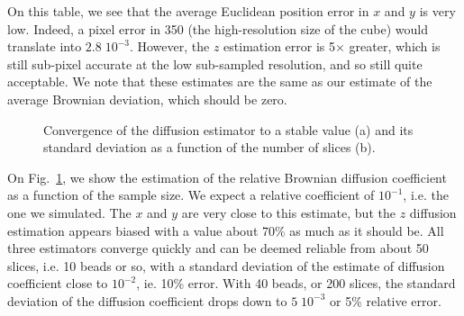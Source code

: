 \documentclass{llncs}
\begin{document}
On this table, we see that the average Euclidean position error in $x$ and $y$ is very low. Indeed, a pixel error in 350 (the high-resolution size of the cube) would translate into $2.8\;10^{-3}$. However, the $z$ estimation error is 5$\times$ greater, which is still sub-pixel accurate at the low sub-sampled resolution, and so still quite acceptable. We note that these estimates are the same as our estimate of the average Brownian deviation, which should be zero.

\begin{figure}
\centering
{}
\caption{Convergence of the diffusion estimator to a stable value (a) and its standard deviation as a function of the number of slices (b).}
\label{fig:estim}
\end{figure}

On Fig.~\ref{fig:estim}, we show the estimation of the relative Brownian diffusion coefficient as a function of the sample size. We expect a relative
coefficient of $10^{-1}$, i.e. the one we simulated. The $x$ and $y$ are very close to this estimate, but the $z$ diffusion estimation appears biased with a value about 70\% as much as it should be. All three estimators converge quickly and can be deemed reliable from about 50 slices, i.e. 10 beads or so, with a standard deviation of the estimate of diffusion coefficient close to $10^{-2}$, ie. 10\% error. With 40 beads, or 200 slices, the standard deviation of the diffusion coefficient drops down to $5\;10^{-3}$ or 5\% relative error.
\end{document}
